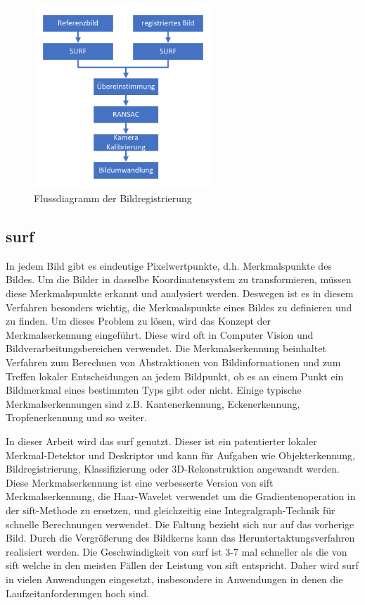 \begin{figure}[H]
 \centering 
 \includegraphics[keepaspectratio,width=0.6\textwidth]{images/3_Ersteverfahren/Bildregistration.pdf}
 \caption{Flussdiagramm der Bildregistrierung}
 \label{fig:Bildregistrierung}
\end{figure}

\subsection{\gls{surf}}
In jedem Bild gibt es eindeutige Pixelwertpunkte, d.h. Merkmalspunkte des Bildes. Um die Bilder in dasselbe Koordinatensystem zu transformieren, müssen diese Merkmalspunkte erkannt und analysiert werden. Deswegen ist es in diesem Verfahren besonders wichtig, die Merkmalspunkte eines Bildes zu definieren und zu finden. Um dieses Problem zu lösen, wird das Konzept der Merkmalserkennung eingeführt. Diese wird oft in Computer Vision und Bildverarbeitungsbereichen verwendet. Die Merkmalserkennung beinhaltet Verfahren zum Berechnen von Abstraktionen von Bildinformationen und zum Treffen lokaler Entscheidungen an jedem Bildpunkt, ob es an einem Punkt ein Bildmerkmal eines bestimmten Typs gibt oder nicht. Einige typische Merkmalserkennungen sind z.B. Kantenerkennung, Eckenerkennung, Tropfenerkennung und so weiter.

In dieser Arbeit wird das \gls{surf} \cite{Surf} genutzt. 
Dieser ist ein patentierter lokaler Merkmal-Detektor und Deskriptor und kann für Aufgaben wie Objekterkennung, Bildregistrierung, Klassifizierung oder 3D-Rekonstruktion angewandt werden. Diese Merkmalserkennung ist eine verbesserte Version von \gls{sift} Merkmalserkennung, die Haar-Wavelet verwendet um die Gradientenoperation in der \gls{sift}-Methode zu ersetzen, und gleichzeitig eine Integralgraph-Technik für schnelle Berechnungen verwendet. Die Faltung bezieht sich nur auf das vorherige Bild. Durch die Vergrößerung des Bildkerns kann das Heruntertaktungsverfahren realisiert werden. Die Geschwindigkeit von \gls{surf} ist 3-7 mal schneller als die von \gls{sift} welche in den meisten Fällen der Leistung von \gls{sift} entspricht. Daher wird \gls{surf} in vielen Anwendungen eingesetzt, insbesondere in Anwendungen in denen die Laufzeitanforderungen hoch sind. 

